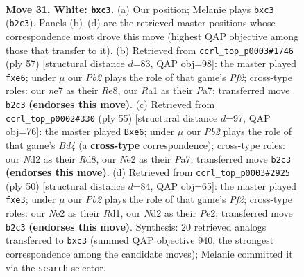 \documentclass[11pt]{article}
\begin{document}
\clearpage

\begin{figure}[p]\centering
\begin{subfigure}{0.46\textwidth}\centering
\resizebox{\linewidth}{!}{%
\newchessgame
\chessboard[
  setfen={r2k4/b3n3/4p3/pp6/b1p3P1/P1q5/1P1NNP2/R1B1K3 w - - 0 31},
  showmover=false,
  pgfstyle=straightmove, color=movearrow, markmove={b2-c3}
]}
\caption{}
\end{subfigure}\hfill
\begin{subfigure}{0.46\textwidth}\centering
\resizebox{\linewidth}{!}{%
\newchessgame
\chessboard[
  setfen={4r1k1/p3bp1p/1p2Q1pB/n3N3/1p5P/6P1/P4P2/2R3K1 b - - 0 29},
  showmover=false,
  pgfstyle=straightmove, color=movearrow, markmove={f7-e6}
]}
\caption{}
\end{subfigure}
\\[4pt]
\begin{subfigure}{0.46\textwidth}\centering
\resizebox{\linewidth}{!}{%
\newchessgame
\chessboard[
  setfen={3r2k1/pp2bp1p/4Q1p1/3bB3/1P6/P7/4BPPP/2R3K1 b - - 0 28},
  showmover=false,
  pgfstyle=straightmove, color=movearrow, markmove={d5-e6}
]}
\caption{}
\end{subfigure}\hfill
\begin{subfigure}{0.46\textwidth}\centering
\resizebox{\linewidth}{!}{%
\newchessgame
\chessboard[
  setfen={2r1kb2/1p2p3/pP6/3Pp1pb/8/B3qN2/P3PP2/3RK3 w - - 0 26},
  showmover=false,
  pgfstyle=straightmove, color=movearrow, markmove={f2-e3}
]}
\caption{}
\end{subfigure}
\caption{\textbf{Move 31, White: \texttt{bxc3}.} (a) Our position; Melanie plays \texttt{bxc3} (\texttt{b2c3}). Panels (b)--(d) are the retrieved master positions whose correspondence most drove this move (highest QAP objective among those that transfer to it). (b) Retrieved from \texttt{ccrl\_top\_p0003\#1746} (ply 57) [structural distance $d$=83, QAP obj=98]: the master played \texttt{fxe6}; under $\mu$ our \emph{Pb2} plays the role of that game's \emph{Pf2}; cross-type roles: our \emph{n}e7 as their \emph{R}e8, our \emph{R}a1 as their \emph{P}a7; transferred move \texttt{b2c3} \textbf{(endorses this move)}. (c) Retrieved from \texttt{ccrl\_top\_p0002\#330} (ply 55) [structural distance $d$=97, QAP obj=76]: the master played \texttt{Bxe6}; under $\mu$ our \emph{Pb2} plays the role of that game's \emph{Bd4} (a \textbf{cross-type} correspondence); cross-type roles: our \emph{N}d2 as their \emph{R}d8, our \emph{N}e2 as their \emph{P}a7; transferred move \texttt{b2c3} \textbf{(endorses this move)}. (d) Retrieved from \texttt{ccrl\_top\_p0003\#2925} (ply 50) [structural distance $d$=84, QAP obj=65]: the master played \texttt{fxe3}; under $\mu$ our \emph{Pb2} plays the role of that game's \emph{Pf2}; cross-type roles: our \emph{N}e2 as their \emph{R}d1, our \emph{N}d2 as their \emph{P}e2; transferred move \texttt{b2c3} \textbf{(endorses this move)}. Synthesis: 20 retrieved analogs transferred to \texttt{bxc3} (summed QAP objective 940, the strongest correspondence among the candidate moves); Melanie committed it via the \texttt{search} selector.}
\label{fig:thought-m60}
\end{figure}
\end{document}

